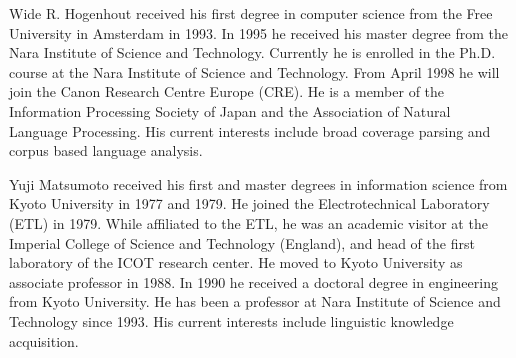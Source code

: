 \begin{biography}

\biotitle{}

{ Wide R. Hogenhout received his first degree in computer science from
the Free University in Amsterdam in 1993. In 1995 he received his
master degree from the Nara Institute of Science and Technology.
Currently he is enrolled in the Ph.D. course at the Nara Institute of
Science and Technology. From April 1998 he will join the Canon Research
Centre Europe (CRE). He is a member of the Information Processing
Society of Japan and the Association of Natural Language Processing.
His current interests include broad coverage parsing and corpus based
language analysis.}

 { Yuji Matsumoto received his first and master
  degrees in information science from Kyoto University in 1977 and 1979. He
  joined the Electrotechnical Laboratory (ETL) in 1979. While affiliated to the
  ETL, he was an academic visitor at the Imperial College of Science and
  Technology (England), and head of the first laboratory of the ICOT research
  center.  He moved to Kyoto University as associate professor in 1988. In 1990
  he received a doctoral degree in engineering from Kyoto University.  He has
  been a professor at Nara Institute of Science and Technology since 1993.  His
  current interests include linguistic knowledge acquisition.  }


\end{biography}




